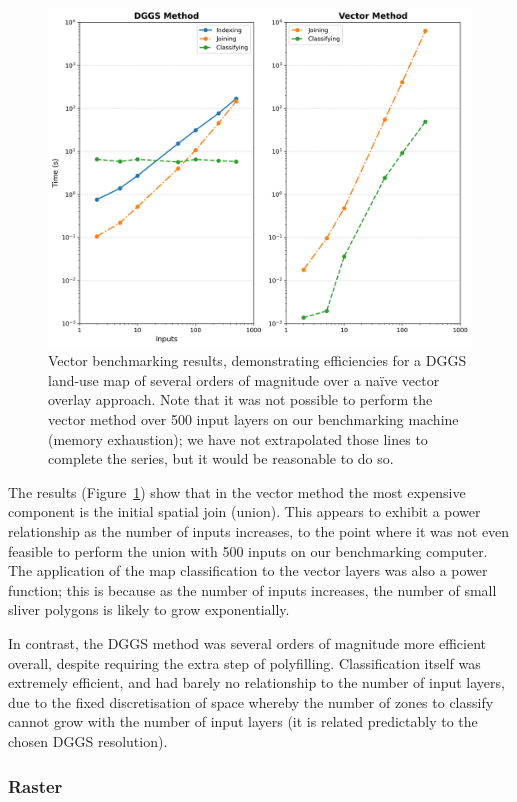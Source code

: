 \documentclass[]{interact}
\theoremstyle{plain}%
\theoremstyle{definition}
\theoremstyle{remark}
\begin{document}
\begin{figure}[t]
    \centering
    \includegraphics[width=0.65\linewidth]{images/vector-results.png}
    \caption{Vector benchmarking results, demonstrating efficiencies for a \ac{DGGS} land-use map of several orders of magnitude over a na\"{i}ve vector overlay approach. Note that it was not possible to perform the vector method over 500 input layers on our benchmarking machine (memory exhaustion); we have not extrapolated those lines to complete the series, but it would be reasonable to do so.}
    \label{fig:BenchmarkVect}
\end{figure}

The results (Figure~\ref{fig:BenchmarkVect}) show that in the vector method the most expensive component is the initial spatial join (union). This appears to exhibit a power relationship as the number of inputs increases, to the point where it was not even feasible to perform the union with 500 inputs on our benchmarking computer. The application of the map classification to the vector layers was also a power function; this is because as the number of inputs increases, the number of small sliver polygons is likely to grow exponentially.

In contrast, the \ac{DGGS} method was several orders of magnitude more efficient overall, despite requiring the extra step of polyfilling. Classification itself was extremely efficient, and had barely no relationship to the number of input layers, due to the fixed discretisation of space whereby the number of zones to classify cannot grow with the number of input layers (it is related predictably to the chosen \ac{DGGS} resolution).

\subsubsection{Raster}
\end{document}
